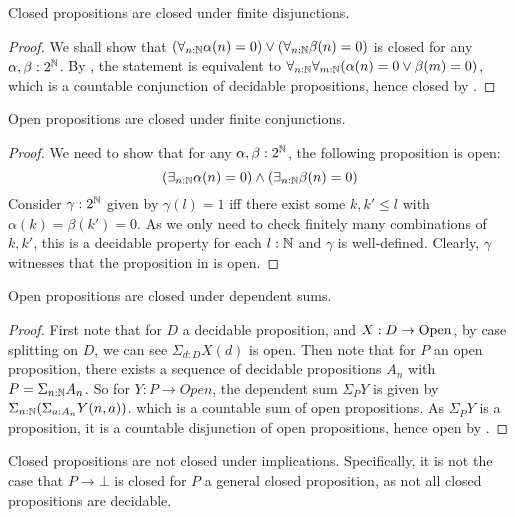 \begin{lemma}\label{ClosedDisjunction} 
  Closed propositions are closed under finite disjunctions. 
\end{lemma}
\begin{proof}
  We shall show that 
  $(\forall_{n:\mathbb{N}} \alpha(n) = 0 )\vee (\forall_{n:\mathbb{N}} \beta(n) = 0 )$ is closed for any $\alpha,\beta:2^{\mathbb{N}}$.
  By , the statement is equivalent to 
  $ \forall_{n:\mathbb{N}}  \forall_{m:\mathbb{N}}  (\alpha(n) = 0 \vee \beta(m) = 0)$, 
  which is a countable conjunction of decidable propositions, 
  hence closed by .
\end{proof}
\begin{lemma}\label{OpenConjunction}
  Open propositions are closed under finite conjunctions. 
\end{lemma}
\begin{proof}
  We need to show that for any $\alpha,\beta:2^{\mathbb{N}}$, the following proposition is open:
  \begin{equation}\label{eqnConjunctionOpen}
    (\exists_{n:\mathbb{N}} \alpha(n) = 0 )\wedge(\exists_{n:\mathbb{N}} \beta(n) = 0 )
  \end{equation}
  Consider $\gamma:2^{\mathbb{N}}$ given by 
  $\gamma(l) = 1$ iff there exist some $k,k'\leq l$ with 
  $\alpha(k) = \beta(k') = 0$. 
  As we only need to check finitely many combinations 
  of $k,k'$, this is a decidable property for each $l:\mathbb{N}$ and $\gamma$ is well-defined. 
  Clearly, $\gamma$ witnesses that the proposition in  is open.
\end{proof}


\begin{lemma}\label{OpenDependentSums}
  Open propositions are closed under dependent sums.
\end{lemma}
\begin{proof}
  First note that for $D$ a decidable proposition, and $X:D \to \mathrm{Open}$,
  by case splitting on $D$, we can see 
  $\Sigma_{d:D} X(d)$ is open.
%
  Then note that for $P$ an open proposition, 
  there exists a sequence of decidable propositions $A_n$ with 
  $P = \Sigma_{n:\mathbb{N}} A_n $.
%
  So for $Y : P \to Open $, the dependent sum $\Sigma_P Y$ is given by 
  $\Sigma_{n:\mathbb{N}} (\Sigma_{a:A_n} Y(n,a))$. 
  which is a countable sum of open propositions. 
  As $\Sigma_P Y$ is a proposition, it is 
  a countable disjunction of open propositions, 
  hence open by .
\end{proof}

\begin{remark}
  Closed propositions are not closed under implications. 
  Specifically, it is not the case that $P\to \bot$ is closed for $P$ a general closed proposition, 
  as not all closed propositions are decidable. 
\end{remark}
